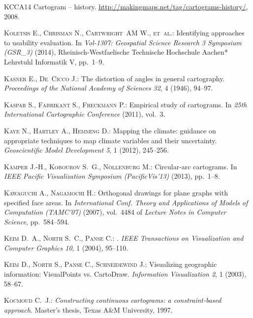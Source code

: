 \documentclass{egpubl}
\begin{document}
\begin{thebibliography}{\uppercase{KCCA{\etalchar{*}}14}}
Cartogram -- history.
\newblock \url{http://makingmaps.net/tag/cartograms-history/}, 2008.

\textsc{Koletsis E., Chrisman N., Cartwright~AM W., et~al.}:
\newblock Identifying approaches to usability evaluation.
\newblock In \emph{Vol-1307: Geospatial Science Research 3 Symposium (GSR\_3)}
  (2014), Rheinisch-Westfaelische Technische Hochschule Aachen* Lehrstuhl
  Informatik V, pp.~1--9.

\textsc{Kasner E., De~Cicco J.}:
\newblock The distortion of angles in general cartography.
\newblock \emph{Proceedings of the National Academy of Sciences 32}, 4 (1946),
  94--97.

\textsc{Kaspar S., Fabrikant S., Freckmann P.}:
\newblock Empirical study of cartograms.
\newblock In \emph{25th International Cartographic Conference} (2011), vol.~3.

\textsc{Kaye N., Hartley A., Hemming D.}:
\newblock Mapping the climate: guidance on appropriate techniques to map
  climate variables and their uncertainty.
\newblock \emph{Geoscientific Model Development 5}, 1 (2012), 245--256.

\textsc{K\"amper J.-H., Kobourov S.~G., N\"ollenburg M.}:
\newblock Circular-arc cartograms.
\newblock In \emph{IEEE Pacific Visualization Symposium (PacificVis'13)}
  (2013), pp.~1--8.

\textsc{Kawaguchi A., Nagamochi H.}:
\newblock Orthogonal drawings for plane graphs with specified face areas.
\newblock In \emph{International Conf. Theory and Applications of Models of
  Computation (TAMC'07)} (2007), vol.~4484 of \emph{Lecture Notes in Computer
  Science}, pp.~584--594.

\textsc{Keim D.~A., North S.~C., Panse C.}:
.
\newblock \emph{IEEE Transactions on Visualization and Computer Graphics 10}, 1
  (2004), 95--110.

\textsc{Keim D., North S., Panse C., Schneidewind J.}:
\newblock Visualizing geographic information: {VisualPoints vs. CartoDraw}.
\newblock \emph{Information Visualization 2}, 1 (2003), 58--67.

\textsc{Kocmoud C.~J.}:
\newblock \emph{Constructing continuous cartograms: a constraint-based
  approach}.
\newblock Master's thesis, Texas A\&M University, 1997.


\end{thebibliography}
\end{document}
